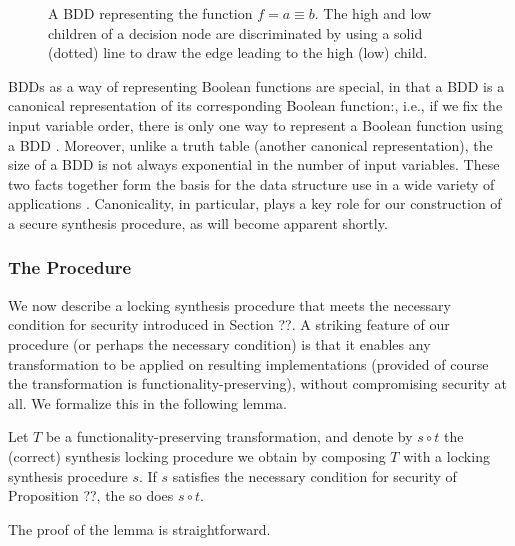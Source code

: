 \begin{figure}[ht]
  \caption{A BDD representing the function $f = a \equiv b$. The high and low children of a decision node are discriminated by using a solid (dotted) line to draw the edge leading to the high (low) child.}
  \label{fig:dummy3}
\end{figure}

BDDs as a way of representing Boolean functions are special, in that a BDD is a canonical representation of its corresponding Boolean function:, i.e., if we fix the input variable order, there is only one way to represent a Boolean function using a BDD \cite{}. Moreover, unlike a truth table (another canonical representation), the size of a BDD is not always exponential in the number of input variables. These two facts together form the basis for the data structure use in a wide variety of applications \cite{}. Canonicality, in particular, plays a key role for our construction of a secure synthesis procedure, as will become apparent shortly.

\subsubsection{The Procedure}

We now describe a locking synthesis procedure that meets the necessary condition for security introduced in Section ??. A striking feature of our procedure (or perhaps the necessary condition) is that it enables any transformation to be applied on resulting implementations (provided of course the transformation is functionality-preserving), without compromising security at all. We formalize this in the following lemma.

\begin{lemma}\label{simple}
Let $T$ be a functionality-preserving transformation, and denote by $s \circ t$ the (correct) synthesis locking procedure we obtain by composing $T$ with a locking synthesis procedure $s$. If $s$ satisfies the necessary condition for security of Proposition ??, the so does $s \circ t$. 
\end{lemma}
The proof of the lemma is straightforward.

